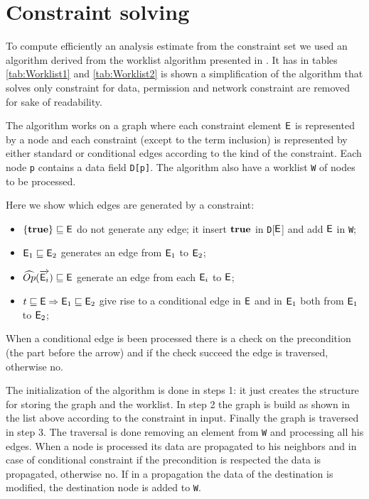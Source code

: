 \section{Constraint solving}
\label{sec:ConstraintSolving}
To compute efficiently an analysis estimate from the constraint set we used an algorithm derived from the worklist algorithm presented in \cite{PrincipleProgramAnalysis, CMLCFA}. It has in tables \ref{tab:Worklist1} and \ref{tab:Worklist2} is shown a simplification of the algorithm that solves only constraint for data, permission and network constraint are removed for sake of readability.

The algorithm works on a graph where each constraint element $\mathsf{E}$ is represented by a node and each constraint (except to the term inclusion) is represented by either standard or conditional edges according to the kind of the constraint. Each node \texttt{p} contains a data field \texttt{D[p]}. The algorithm also have a worklist \texttt{W} of nodes to be processed.

Here we show which edges are generated by a constraint:
\begin{itemize}
\item $\{\mathbf{true}\} \sqsubseteq \mathsf{E} $ do not generate any edge; it insert $\mathbf{true}$ in \texttt{D}[$\mathsf{E}$] and add $\mathsf{E}$ in \texttt{W};
\item $\mathsf{E}_1 \sqsubseteq \mathsf{E}_2$ generates an edge from $\mathsf{E}_1$ to $\mathsf{E}_2$;
\item $\widehat{Op}(\overrightarrow{\mathsf{E}_i})\sqsubseteq \mathsf{E}$ generate an edge from each $\mathsf{E}_i$ to $\mathsf{E}$;
\item $t \sqsubseteq \mathsf{E} \Rightarrow \mathsf{E}_1 \sqsubseteq \mathsf{E}_2$ give rise to a conditional edge in $\mathsf{E}$ and in $\mathsf{E}_1$ both from $\mathsf{E}_1$ to $\mathsf{E}_2$;
\end{itemize}

When a conditional edge is been processed there is a check on the precondition (the part before the arrow) and if the check succeed the edge is traversed, otherwise no.

The initialization of the algorithm is done in steps 1: it just creates the structure for storing the graph and the worklist. In step 2 the graph is build as shown in the list above according to the constraint in input. Finally the graph is traversed in step 3. The traversal is done removing an element from \texttt{W} and processing all his edges. When a node is processed its data are propagated to his neighbors and in case of conditional constraint if the precondition is respected the data is propagated, otherwise no. If in a propagation the data of the destination is modified, the destination node is added to \texttt{W}.

